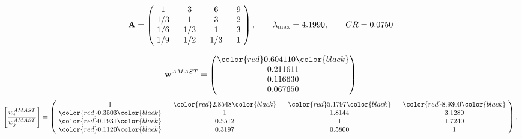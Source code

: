 \begin{example}
\begin{equation*}
\mathbf{A} =
\begin{pmatrix}
$\,\,$ 1 $\,\,$ & $\,\,$3$\,\,$ & $\,\,$6$\,\,$ & $\,\,$9 $\,\,$ \\
$\,\,$ 1/3$\,\,$ & $\,\,$ 1 $\,\,$ & $\,\,$3$\,\,$ & $\,\,$2 $\,\,$ \\
$\,\,$ 1/6$\,\,$ & $\,\,$ 1/3$\,\,$ & $\,\,$ 1 $\,\,$ & $\,\,$3 $\,\,$ \\
$\,\,$ 1/9$\,\,$ & $\,\,$ 1/2$\,\,$ & $\,\,$ 1/3$\,\,$ & $\,\,$ 1  $\,\,$ \\
\end{pmatrix},
\qquad
\lambda_{\max} =
4.1990,
\qquad
CR = 0.0750
\end{equation*}

\begin{equation*}
\mathbf{w}^{AMAST} =
\begin{pmatrix}
\color{red} 0.604110\color{black} \\
0.211611\\
0.116630\\
0.067650
\end{pmatrix}\end{equation*}
\begin{equation*}
\left[ \frac{{w}^{AMAST}_i}{{w}^{AMAST}_j} \right] =
\begin{pmatrix}
$\,\,$ 1 $\,\,$ & $\,\,$\color{red} 2.8548\color{black} $\,\,$ & $\,\,$\color{red} 5.1797\color{black} $\,\,$ & $\,\,$\color{red} 8.9300\color{black} $\,\,$ \\
$\,\,$\color{red} 0.3503\color{black} $\,\,$ & $\,\,$ 1 $\,\,$ & $\,\,$1.8144$\,\,$ & $\,\,$3.1280  $\,\,$ \\
$\,\,$\color{red} 0.1931\color{black} $\,\,$ & $\,\,$0.5512$\,\,$ & $\,\,$ 1 $\,\,$ & $\,\,$1.7240 $\,\,$ \\
$\,\,$\color{red} 0.1120\color{black} $\,\,$ & $\,\,$0.3197$\,\,$ & $\,\,$0.5800$\,\,$ & $\,\,$ 1  $\,\,$ \\
\end{pmatrix},
\end{equation*}


\end{example}

